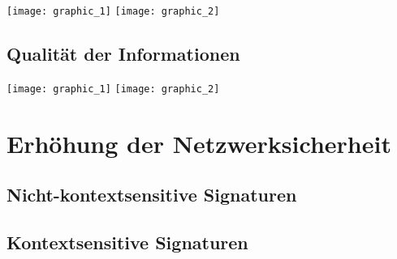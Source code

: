 \texttt{[image: graphic\_1]}
\texttt{[image: graphic\_2]}
\subsection{Qualität der Informationen}
\texttt{[image: graphic\_1]}
\texttt{[image: graphic\_2]}
\pagebreak

\section{Erhöhung der Netzwerksicherheit}
\subsection{Nicht-kontextsensitive Signaturen}
\subsection{Kontextsensitive Signaturen} 
